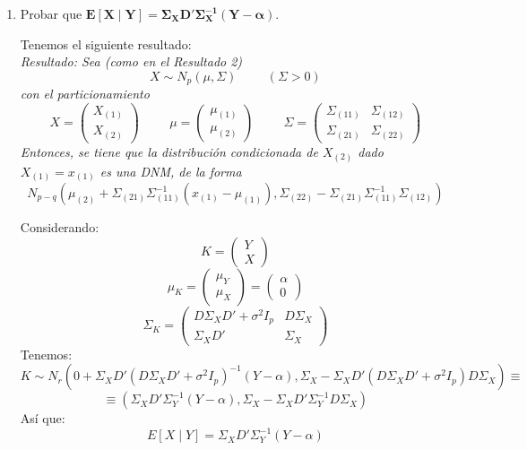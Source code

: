 \documentclass[11pt,a4paper]{article}
\begin{document}
\begin{enumerate}[label=\arabic*.]
\begin{enumerate}[label=\alph*)]
\vspace{1cm}
\bfseries
\item Probar que $\mathbf{E[X \mid Y] = \Sigma_{X}D'\Sigma_{X}^{-1}(Y-\alpha)}$.
\vspace{0.5cm}
\normalfont

Tenemos el siguiente resultado: \\
\itshape
Resultado: Sea (como en el Resultado 2)
$$X \sim N_{p}(\mu, \Sigma) \hspace{1cm} (\Sigma > 0)$$
con el particionamiento
$$X = \begin{pmatrix} X_{(1)} \\ X_{(2)} \end{pmatrix} \hspace{1cm} \mu = \begin{pmatrix} \mu_{(1)} \\ \mu_{(2)} \end{pmatrix} \hspace{1cm} \Sigma = \begin{pmatrix}
\Sigma_{(11)} & \Sigma_{(12)} \\
\Sigma_{(21)} & \Sigma_{(22)}
\end{pmatrix}$$
Entonces, se tiene que la distribución condicionada de $X_{(2)}$ dado $X_{(1)} = x_{(1)}$ es una DNM, de la forma
$$N_{p-q}(\mu_{(2)} + \Sigma_{(21)}\Sigma_{(11)}^{-1}(x_{(1)} - \mu_{(1)}), \Sigma_{(22)} - \Sigma_{(21)}\Sigma_{(11)}^{-1}\Sigma_{(12)})$$
\normalfont

Considerando:
$$K = \begin{pmatrix} Y \\ X \end{pmatrix}$$
$$\mu_{K} = \begin{pmatrix} \mu_{Y} \\ \mu_{X} \end{pmatrix} = \begin{pmatrix} \alpha \\ 0 \end{pmatrix}$$
$$\Sigma_{K} = \begin{pmatrix}
D\Sigma_{X}D' + \sigma^{2}I_{p} & D\Sigma_{X} \\
\Sigma_{X}D' & \Sigma_{X}
\end{pmatrix}$$
Tenemos:
$$K \sim N_{r}(0 + \Sigma_{X}D'(D\Sigma_{X}D' + \sigma^{2}I_{p})^{-1}(Y-\alpha), \Sigma_{X} - \Sigma_{X}D'(D\Sigma_{X}D' + \sigma^{2}I_{p})D\Sigma_{X}) \equiv$$
$$\equiv (\Sigma_{X}D'\Sigma_{Y}^{-1}(Y-\alpha), \Sigma_{X} - \Sigma_{X}D'\Sigma_{Y}^{-1}D\Sigma_{X})$$
Así que:
$$E[X \mid Y] = \Sigma_{X}D'\Sigma_{Y}^{-1}(Y-\alpha)$$


\end{enumerate}
\end{enumerate}
\end{document}
